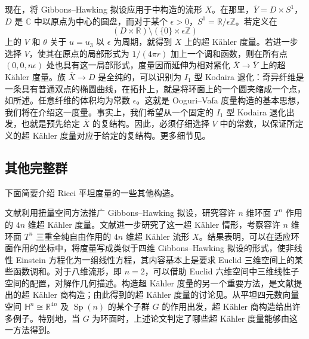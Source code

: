 现在，将 Gibbons--Hawking 拟设应用于中构造的流形 $X$。在那里，$\overline Y=D\times S^1$，$D$ 是 $\mathbb C$ 中以原点为中心的圆盘，而对于某个 $\epsilon>0$，$S^1=\mathbb R/\epsilon\mathbb Z$。若定义在
\[
(D\times\mathbb R)\setminus(\{0\}\times\epsilon\mathbb Z)
\]
上的 $V$ 和 $\theta$ 关于 $u=u_3$ 以 $\epsilon$ 为周期，就得到 $X$ 上的超 Kähler 度量。若进一步选择 $V$，使其在原点的局部形式为 $1/(4\pi r)$ 加上一个调和函数，则在所有点 $(0,0,n\epsilon)$ 处也具有这一局部形式，度量因而延伸为相对紧化 $\overline X\to\overline Y$ 上的超 Kähler 度量。族 $\overline X\to D$ 是全纯的，可以识别为 $I_1$ 型 Kodaira 退化：奇异纤维是一条具有普通双点的椭圆曲线，在拓扑上，就是将环面上的一个圆夹缩成一个点，如所述。任意纤维的体积均为常数 $\epsilon$。这就是 Ooguri--Vafa 度量构造的基本思想，我们将在介绍这一度量。事实上，我们希望从一个固定的 $I_1$ 型 Kodaira 退化出发，也就是预先给定 $\overline X$ 的复结构。因此，必须仔细选择 $V$ 中的常数，以保证所定义的超 Kähler 度量对应于给定的复结构。更多细节见。

\subsection{其他完整群}\label{sec:7.1.4}

下面简要介绍 Ricci 平坦度量的一些其他构造。

文献利用扭量空间方法推广 Gibbons--Hawking 拟设，研究容许 $n$ 维环面 $T^n$ 作用的 $4n$ 维超 Kähler 度量。文献进一步研究了这一超 Kähler 情形，考察容许 $n$ 维环面 $T^n$ 三重全纯自由作用的 $4n$ 维超 Kähler 流形 $X$。结果表明，可以在适应环面作用的坐标中，将度量写成类似于四维 Gibbons--Hawking 拟设的形式，使非线性 Einstein 方程化为一组线性方程，其内容基本上是要求 Euclid 三维空间上的某些函数调和。对于八维流形，即 $n=2$，可以借助 Euclid 六维空间中三维线性子空间的配置，对解作几何描述。构造超 Kähler 度量的另一个重要方法，是文献提出的超 Kähler 商构造；由此得到的超 Kähler 度量的讨论见。从平坦四元数向量空间 $\mathbb H^n\cong\mathbb R^{4n}$ 及 $\operatorname{Sp}(n)$ 的某个子群 $G$ 的作用出发，超 Kähler 商构造给出许多例子。特别地，当 $G$ 为环面时，上述论文判定了哪些超 Kähler 度量能够由这一方法得到。

